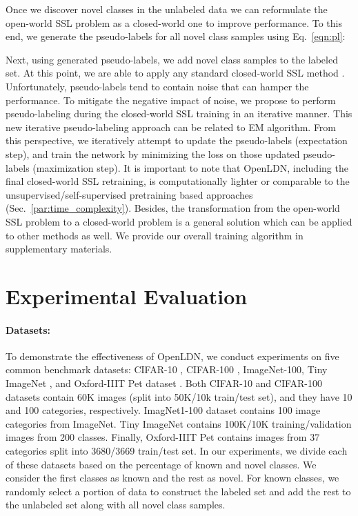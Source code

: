 \documentclass[runningheads]{eccv2022submission}
\begin{document}
Once we discover novel classes in the unlabeled data we can reformulate the open-world SSL problem as a closed-world one to improve performance. To this end, we generate the pseudo-labels for all novel class samples using Eq.~\ref{eqn:pl}:



Next, using generated pseudo-labels, we add novel class samples to the labeled set. At this point, we are able to apply any standard closed-world SSL method \cite{NIPS2019_8749_MixMatch,xie2019unsupervised,FixMatch,NIPS2017_6719_meanT}. Unfortunately, pseudo-labels tend to contain noise that can hamper the performance. To mitigate the negative impact of noise, we propose to perform pseudo-labeling during the closed-world SSL training in an iterative manner. This new iterative pseudo-labeling approach can be related to EM algorithm. From this perspective, we iteratively attempt to update the pseudo-labels (expectation step), and train the network by minimizing the loss on those updated pseudo-labels (maximization step). It is important to note that OpenLDN, including the final closed-world SSL retraining, is computationally lighter or comparable to the unsupervised/self-supervised pretraining based approaches (Sec.~\ref{par:time_complexity}). Besides, the transformation from the open-world SSL problem to a closed-world problem is a general solution which can be applied to other methods as well. We provide our overall training algorithm in supplementary materials. 



\vspace{-2mm}
\section{Experimental Evaluation}
\vspace{-2mm}
\label{sec:exp}
\paragraph{\textbf{Datasets:}}
\label{para:dataset}
To demonstrate the effectiveness of OpenLDN, we conduct experiments on five common benchmark datasets: CIFAR-10 \cite{cifar10}, CIFAR-100 \cite{cifar100}, ImageNet-100\cite{deng2009imagenet}, Tiny ImageNet \cite{le2015tiny}, and Oxford-IIIT Pet dataset \cite{parkhi12a}. Both CIFAR-10 and CIFAR-100 datasets contain 60K images (split into 50K/10k train/test set), and they have 10 and 100 categories, respectively. ImagNet1-100 dataset contains 100 image categories from ImageNet. Tiny ImageNet contains 100K/10K training/validation images from 200 classes. Finally, Oxford-IIIT Pet contains images from 37 categories split into 3680/3669 train/test set. In our experiments, we divide each of these datasets based on the percentage of known and novel classes. We consider the first  classes as known and the rest as novel. For known classes, we randomly select a portion of data to construct the labeled set and add the rest to the unlabeled set along with all novel class samples.
\end{document}
